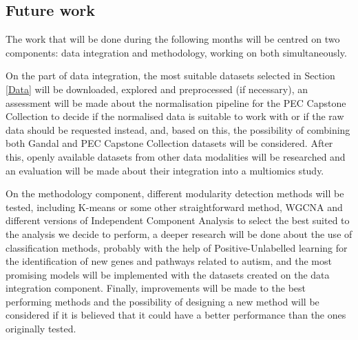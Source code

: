 
\subsection{Future work}\label{FutureWork}
The work that will be done during the following months will be centred on two components: data integration and methodology, working on both simultaneously.

On the part of data integration, the most suitable datasets selected in Section \ref{Data} will be downloaded, explored and preprocessed (if necessary), an assessment will be made about the normalisation pipeline for the PEC Capstone Collection to decide if the normalised data is suitable to work with or if the raw data should be requested instead, and, based on this, the possibility of combining both Gandal and PEC Capstone Collection datasets will be considered. After this, openly available datasets from other data modalities will be researched and an evaluation will be made about their integration into a multiomics study.

On the methodology component, different modularity detection methods will be tested, including K-means or some other straightforward method, WGCNA and different versions of Independent Component Analysis to select the best suited to the analysis we decide to perform, a deeper research will be done about the use of classification methods, probably with the help of Positive-Unlabelled learning for the identification of new genes and pathways related to autism, and the most promising models will be implemented with the datasets created on the data integration component. Finally, improvements will be made to the best performing methods and the possibility of designing a new method will be considered if it is believed that it could have a better performance than the ones originally tested.
